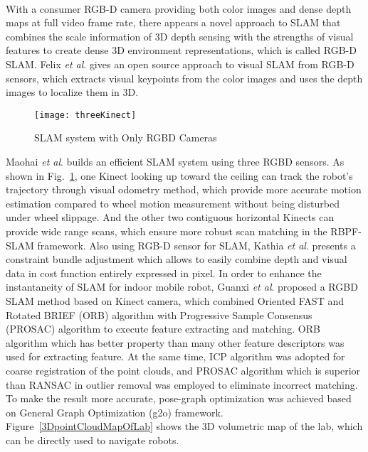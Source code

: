 \\\indent
With a consumer RGB-D camera providing both color images and dense depth maps at full video frame rate, there appears a novel approach to SLAM that combines the scale information of 3D depth sensing with the strengths of visual features to create dense 3D environment representations, which is called RGB-D SLAM. Felix \textit{et al}. \cite{RGBDSLAM01_2012} gives an open source approach to visual SLAM from RGB-D sensors, which extracts visual keypoints from the color images and uses the depth images to localize them in 3D. %
%
\begin{figure}[t]
\centering
\texttt{[image: threeKinect]}
\caption{SLAM system with Only RGBD Cameras \cite{RGBDSLAMsystem_2013}}
\label{threeKinect}
\end{figure}%
%
Maohai \textit{et al}. \cite{RGBDSLAMsystem_2013} builds an efficient SLAM system using three RGBD sensors. As shown in Fig.~\ref{threeKinect}, one Kinect looking up toward the ceiling can track the robot's trajectory through visual odometry method, which provide more accurate motion estimation compared to wheel motion measurement without being disturbed under wheel slippage. And the other two contiguous horizontal Kinects can provide wide range scans, which ensure more robust scan matching in the RBPF-SLAM framework. Also using RGB-D sensor for SLAM, Kathia \textit{et al}. \cite{bundleSLAMRGBD_2015} presents a constraint bundle adjustment which allows to easily combine depth and visual data in cost function entirely expressed in pixel. In order to enhance the instantaneity of SLAM for indoor mobile robot, Guanxi \textit{et al}. \cite{indorRGBDSLAM_2015} proposed a RGBD SLAM method based on Kinect camera, which combined Oriented FAST and Rotated BRIEF (ORB) algorithm with Progressive Sample Consensus (PROSAC) algorithm to execute feature extracting and matching. %
%
%
ORB algorithm which has better property than many other feature descriptors was used for extracting feature. At the same time, ICP algorithm was adopted for coarse registration of the point clouds, and PROSAC algorithm which is superior than RANSAC in outlier removal was employed to eliminate incorrect matching. To make the result more accurate, pose-graph optimization was achieved based on General Graph Optimization (g2o) framework. Figure~\ref{3DpointCloudMapOfLab} shows the 3D volumetric map of the lab, which can be directly used to navigate robots.
\\\indent%
